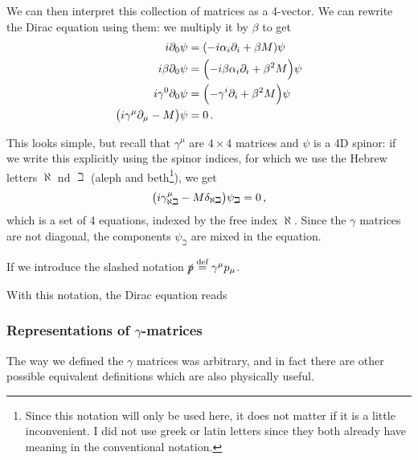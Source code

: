 \documentclass[main.tex]{subfiles}
\begin{document}
We can then interpret this collection of matrices as a 4-vector. 
We can rewrite the Dirac equation using them: we multiply it by \(\beta \) to get 
%
\begin{subequations} \label{eq:dirac-equation-from-ansatz-to-gamma}
\begin{align}
i \partial_0 \psi &= \qty(-i \alpha_{i} \partial_{i}+ \beta M ) \psi  \\
i \beta \partial_0 \psi &= \qty(-i \beta \alpha_{i} \partial_{i} + \beta^2 M) \psi  \\
i \gamma^{0} \partial_0 \psi &= \qty(- \gamma^{i}\partial_{i} + \beta^2 M) \psi  \\
\qty(i \gamma^{\mu } \partial_{\mu } - M ) \psi &= 0 
\,.
\end{align}
\end{subequations}

This looks simple, but recall that \(\gamma^{\mu }\) are \(4 \times 4\) matrices and \(\psi \) is a 4D spinor: if we write this explicitly using the spinor indices, for which we use the Hebrew letters \(\aleph\) nd \(\beth\) (aleph and beth\footnote{Since this notation will only be used here, it does not matter if it is a little inconvenient. I did not use greek or latin letters since they both already have meaning in the conventional notation.}), we get 
%
\begin{align}
\qty(i \gamma^{\mu }_{\aleph \beth} - M \delta_{\aleph \beth}) \psi_{\beth} = 0 
\,,
\end{align}
%
which is a set of 4 equations, indexed by the free index \(\aleph\).
Since the \(\gamma \) matrices are not diagonal, the components \(\psi_{\beth}\) are mixed in the equation. 

If we introduce the slashed notation \(\slashed{p} \overset{\text{def}}{=} \gamma^{\mu }p_{\mu }\). 

With this notation, the Dirac equation reads 
%

\subsubsection{Representations of \(\gamma \)-matrices}

The way we defined the \(\gamma \) matrices was arbitrary, and in fact there are other possible equivalent definitions which are also physically useful. 
\end{document}
